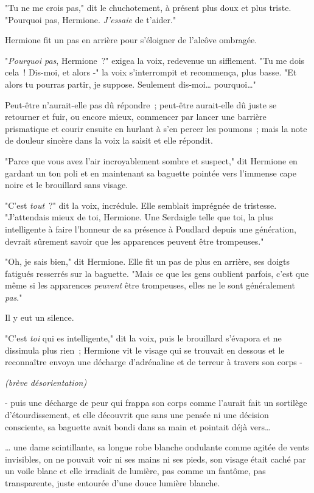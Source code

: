 "Tu ne me crois pas," dit le chuchotement, à présent plus doux et plus triste. "Pourquoi pas, Hermione. \emph{J'essaie} de t'aider."

Hermione fit un pas en arrière pour s'éloigner de l'alcôve ombragée.

"\emph{Pourquoi pas}, Hermione~?" exigea la voix, redevenue un sifflement. "Tu me dois cela~! Dis-moi, et alors -" la voix s'interrompit et recommença, plus basse. "Et alors tu pourras partir, je suppose. Seulement dis-moi… pourquoi…"

Peut-être n'aurait-elle pas dû répondre~; peut-être aurait-elle dû juste se retourner et fuir, ou encore mieux, commencer par lancer une barrière prismatique et courir ensuite en hurlant à s'en percer les poumons~; mais la note de douleur sincère dans la voix la saisit et elle répondit.

"Parce que vous avez l'air incroyablement sombre et suspect," dit Hermione en gardant un ton poli et en maintenant sa baguette pointée vers l'immense cape noire et le brouillard sans visage.

"C'est \emph{tout}~?" dit la voix, incrédule. Elle semblait imprégnée de tristesse. "J'attendais mieux de toi, Hermione. Une Serdaigle telle que toi, la plus intelligente à faire l'honneur de sa présence à Poudlard depuis une génération, devrait sûrement savoir que les apparences peuvent être trompeuses."

"Oh, je sais bien," dit Hermione. Elle fit un pas de plus en arrière, ses doigts fatigués resserrés sur la baguette. "Mais ce que les gens oublient parfois, c'est que même si les apparences \emph{peuvent} être trompeuses, elles ne le sont généralement \emph{pas}."

Il y eut un silence.

"C'est \emph{toi} qui es intelligente," dit la voix, puis le brouillard s'évapora et ne dissimula plus rien~; Hermione vit le visage qui se trouvait en dessous et le reconnaître envoya une décharge d'adrénaline et de terreur à travers son corps -

\emph{(brève désorientation)}

- puis une décharge de peur qui frappa son corps comme l'aurait fait un sortilège d'étourdissement, et elle découvrit que sans une pensée ni une décision consciente, sa baguette avait bondi dans sa main et pointait déjà vers…

… une dame scintillante, sa longue robe blanche ondulante comme agitée de vents invisibles, on ne pouvait voir ni ses mains ni ses pieds, son visage était caché par un voile blanc et elle irradiait de lumière, pas comme un fantôme, pas transparente, juste entourée d'une douce lumière blanche.

